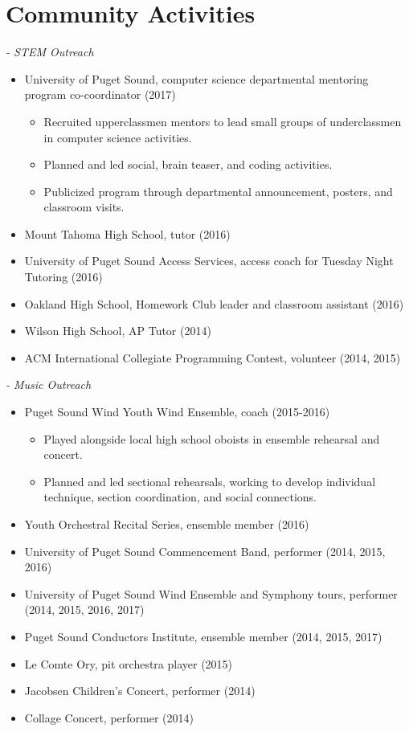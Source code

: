 \section{Community Activities}
\textit{- STEM Outreach}
\begin{itemize}
\item University of Puget Sound, computer science departmental mentoring program co-coordinator (2017)
\begin{itemize}
\item Recruited upperclassmen mentors to lead small groups of underclassmen in computer science activities.
\item Planned and led social, brain teaser, and coding activities.
\item Publicized program through departmental announcement, posters, and classroom visits.
\end{itemize}
\item Mount Tahoma High School, tutor (2016)
\item University of Puget Sound Access Services, access coach for Tuesday Night Tutoring (2016)
\item Oakland High School, Homework Club leader and classroom assistant (2016)
\item Wilson High School, AP Tutor (2014)
\item ACM International Collegiate Programming Contest, volunteer (2014, 2015)
\end{itemize}
\vspace{-3.5mm}
\textit{- Music Outreach}
\begin{itemize}
\item Puget Sound Wind Youth Wind Ensemble, coach (2015-2016)
\begin{itemize}
\item Played alongside local high school oboists in ensemble rehearsal and concert.
\item Planned and led sectional rehearsals, working to develop individual technique, section coordination, and social connections.
\end{itemize}
\item Youth Orchestral Recital Series, ensemble member (2016)
\item University of Puget Sound Commencement Band, performer (2014, 2015, 2016)
\item University of Puget Sound Wind Ensemble and Symphony tours, performer (2014, 2015, 2016, 2017)
\item Puget Sound Conductors Institute, ensemble member (2014, 2015, 2017)
\item Le Comte Ory, pit orchestra player (2015)
\item Jacobsen Children's Concert, performer (2014)
\item Collage Concert, performer (2014)
\end{itemize}

